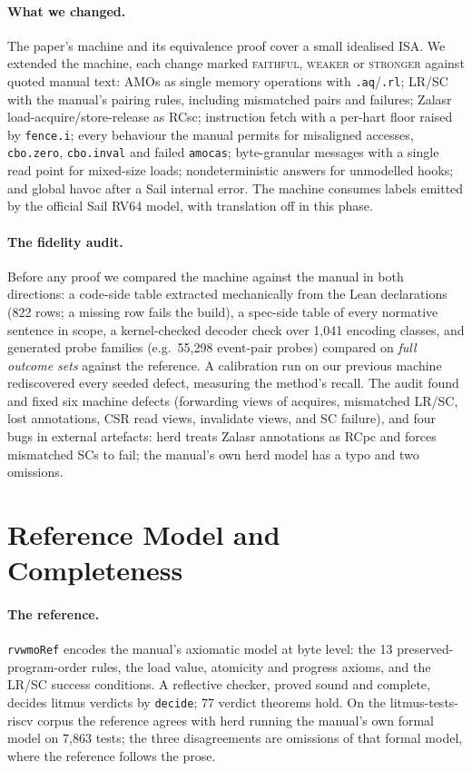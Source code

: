 \documentclass[sigplan,screen,nonacm]{acmart}
\newcommand{\code}[1]{\texttt{#1}}
\begin{document}
\paragraph{What we changed.}
The paper's machine and its equivalence proof cover a small idealised ISA. We extended the machine, each change marked
\textsc{faithful}, \textsc{weaker} or \textsc{stronger} against quoted manual text: AMOs as single memory operations
with \code{.aq}/\code{.rl}; LR/SC with the manual's pairing rules, including mismatched pairs and failures; Zalasr
load-acquire/store-release as RCsc; instruction fetch with a per-hart floor raised by \code{fence.i}; every behaviour
the manual permits for misaligned accesses, \code{cbo.zero}, \code{cbo.inval} and failed \code{amocas}; byte-granular
messages with a single read point for mixed-size loads; nondeterministic answers for unmodelled hooks; and global
havoc after a Sail internal error. The machine consumes labels emitted by the official Sail RV64 model, with
translation off in this phase.

\paragraph{The fidelity audit.}
Before any proof we compared the machine against the manual in both directions: a code-side table extracted
mechanically from the Lean declarations (822 rows; a missing row fails the build), a spec-side table of every
normative sentence in scope, a kernel-checked decoder check over 1{,}041 encoding classes, and generated probe
families (e.g.\ 55{,}298 event-pair probes) compared on \emph{full outcome sets} against the reference. A calibration
run on our previous machine rediscovered every seeded defect, measuring the method's recall. The audit found and fixed
six machine defects (forwarding views of acquires, mismatched LR/SC, lost annotations, CSR read views, invalidate
views, and SC failure), and four bugs in external artefacts: herd treats Zalasr annotations as RCpc and forces
mismatched SCs to fail; the manual's own herd model has a typo and two omissions.

\section{Reference Model and Completeness}

\paragraph{The reference.}
\code{rvwmoRef} encodes the manual's axiomatic model at byte level: the 13 preserved-program-order rules, the load
value, atomicity and progress axioms, and the LR/SC success conditions. A reflective checker, proved sound and
complete, decides litmus verdicts by \code{decide}; 77 verdict theorems hold. On the litmus-tests-riscv corpus the
reference agrees with herd running the manual's own formal model on 7{,}863 tests; the three disagreements are
omissions of that formal model, where the reference follows the prose.
\end{document}
